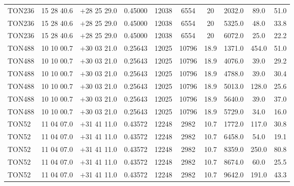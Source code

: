 \begin{landscape}
\begin{center}
\begin{longtable}{l c c c c c c c c c}
TON236  &                  15 28 40.6  &         $+$28 25 29.0  &       0.45000  & 12038  &   6554  &       20  &        2032.0  &  89.0  &   51.0  \\
TON236  &                  15 28 40.6  &         $+$28 25 29.0  &       0.45000  & 12038  &   6554  &       20  &        5325.0  &  48.0  &   33.8  \\
TON236  &                  15 28 40.6  &         $+$28 25 29.0  &       0.45000  & 12038  &   6554  &       20  &        6072.0  &  25.0  &   22.2  \\
TON488  &                  10 10 00.7  &         $+$30 03 21.0  &       0.25643  & 12025  &   10796  &      18.9  &      1371.0  &  454.0  &  51.0  \\
TON488  &                  10 10 00.7  &         $+$30 03 21.0  &       0.25643  & 12025  &   10796  &      18.9  &      4076.0  &  39.0  &   29.2  \\
TON488  &                  10 10 00.7  &         $+$30 03 21.0  &       0.25643  & 12025  &   10796  &      18.9  &      4788.0  &  39.0  &   30.4  \\
TON488  &                  10 10 00.7  &         $+$30 03 21.0  &       0.25643  & 12025  &   10796  &      18.9  &      5013.0  &  128.0  &  25.6  \\
TON488  &                  10 10 00.7  &         $+$30 03 21.0  &       0.25643  & 12025  &   10796  &      18.9  &      5640.0  &  39.0  &   37.0  \\
TON488  &                  10 10 00.7  &         $+$30 03 21.0  &       0.25643  & 12025  &   10796  &      18.9  &      5729.0  &  34.0  &   16.0  \\
TON52  &                   11 04 07.0  &         $+$31 41 11.0  &       0.43572  & 12248  &   2982  &       10.7  &      1772.0  &  117.0  &  30.8  \\
TON52  &                   11 04 07.0  &         $+$31 41 11.0  &       0.43572  & 12248  &   2982  &       10.7  &      6458.0  &  54.0  &   19.1  \\
TON52  &                   11 04 07.0  &         $+$31 41 11.0  &       0.43572  & 12248  &   2982  &       10.7  &      8359.0  &  250.0  &  80.8  \\
TON52  &                   11 04 07.0  &         $+$31 41 11.0  &       0.43572  & 12248  &   2982  &       10.7  &      8674.0  &  60.0  &   25.5  \\
TON52  &                   11 04 07.0  &         $+$31 41 11.0  &       0.43572  & 12248  &   2982  &       10.7  &      9642.0  &  191.0  &  43.3  \\

\end{longtable}
\end{center}
\end{landscape}
